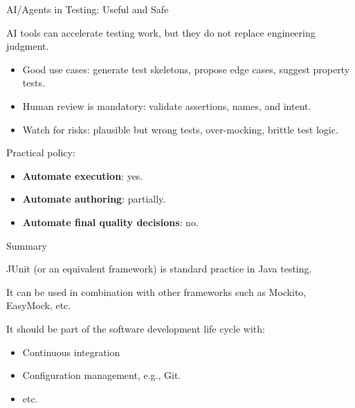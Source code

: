 \documentclass[11pt, xcolor=svgnames]{beamer}
\providecommand{\alert}[1]{\textbf{#1}}
\begin{document}

\begin{frame}{AI/Agents in Testing: Useful and Safe}

AI tools can accelerate testing work, but they do not replace engineering judgment.

\begin{itemize}
  \item Good use cases: generate test skeletons, propose edge cases, suggest property tests.
  \item Human review is mandatory: validate assertions, names, and intent.
  \item Watch for risks: plausible but wrong tests, over-mocking, brittle test logic.
\end{itemize}

Practical policy:
\begin{itemize}
  \item \alert{Automate execution}: yes.
  \item \alert{Automate authoring}: partially.
  \item \alert{Automate final quality decisions}: no.
\end{itemize}

\end{frame}


\begin{frame}[fragile]{Summary}

JUnit (or an equivalent framework) is standard practice in Java testing.

It can be used in combination with other frameworks such as Mockito, EasyMock, etc.

It should be part of the software development life cycle with:
\begin{itemize}
  \item Continuous integration
  \item Configuration management, e.g., Git.
  \item etc.
\end{itemize}

\end{frame}


\end{document}
